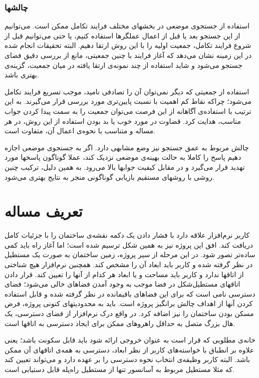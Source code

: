 \documentclass{report}
\begin{document}
\subsubsection{چالشها}
استفاده از جستجوی موضعی در بخشهای مختلف فرایند تکامل ممکن است. می‌توانیم از این جستجو بعد یا قبل از اعمال عملگرها استفاده کنیم، یا حتی می‌توانیم قبل از شروع فرایند تکامل، جمعیت اولیه را با این روش ارتقا دهیم. البته تحقیقات انجام شده در این زمینه نشان می‌دهد که آغاز فرایند با چنین جمعیتی، مانع از بررسی دقیق فضای جستجو می‌شود و شاید استفاده از چند نمونه‌ی ارتقا یافته در میان جمعیت، گزینه‌ی بهتری باشد.

استفاده از جمعیتی که دیگر نمی‌توان آن را تصادفی نامید، موجب تسریع فرایند تکامل می‌شود؛ چراکه نقاط کم اهمیت با نسبت پایین‌تری مورد بررسی قرار می‌گیرند. به این ترتیب با استفاده‌ی آگاهانه از این فرصت می‌توان جمعیت را به سمت پیدا کردن جواب مناسب، هدایت کرد. قضاوت در مورد خوب یا بد بودن استفاده از این روش، در هر مساله و متناسب با نحوه‌ی اعمال آن، متفاوت است.

چالش مربوط به عمق جستجو نیز وضع مشابهی دارد. اگر به جستجوی موضعی اجازه دهیم پاسخ را کاملا به حالت بهینه‌ی موضعی نزدیک کند، عملا گوناگون پاسخها مورد تهدید قرار می‌گیرد و در مقابل کیفیت جوابها بالا می‌رود. به همین دلیل، ترکیب چنین روشی با روشهای مستقیم بازیابی گوناگونی منجر به نتایج بهتری می‌شود.

\section{تعریف مساله}
کاربر نرم‌افزار علاقه دارد با فشار دادن یک دکمه نقشه‌ی ساختمان را با جزئیات کامل دریافت کند. افق این پروژه نیز به همین شکل ترسیم شده است؛ اما آغاز راه باید کمی ساده‌تر تصور شود. در این مرحله از سیر پروژه، زمین ساختمان به صورت یک مستطیل در نظر گرفته شده و کاربر باید ابعاد آن را مشخص کند. همچنین نرم‌افزار هیچ شناختی از اتاقها ندارد و کاربر باید مساحت و یا ابعاد هر کدام از آنها را تعیین کند. قرار دادن اتاقهای مستطیل‌شکل در فضا موجب به وجود آمدن فضاهای خالی می‌شود؛ فضای دسترسی نامی است که برای این فضاهای باقیمانده در نظر گرفته شده و قابل استفاده کردن آنها از اهداف چالش برانگیز پروژه است. باید به محدودیتهای کنونی پروژه، فرض مسکن بودن ساختمان را نیز اضافه کرد. در واقع درک نرم‌افزار از فضای دسترسی، یک هال بزرگ متصل به حداقل راهروهای ممکن برای ایجاد دسترسی به اتاقها است.

خانه‌ی مطلوبی که قرار است به عنوان خروجی ارائه شود باید قابل سکونت باشد؛ یعنی علاوه بر انطباق با خواسته‌های کاربر از نظر ابعاد، دسترسی به همه‌ی اتاقهای آن ممکن باشد. البته کاربر وظیفه‌ی انتخاب نحوه دسترسی را بر عهده دارد و می‌تواند تعیین کند که مثلا مستطیل مربوط به آسانسور تنها از مستطیل راه‌پله قابل دستیابی است.
\end{document}
